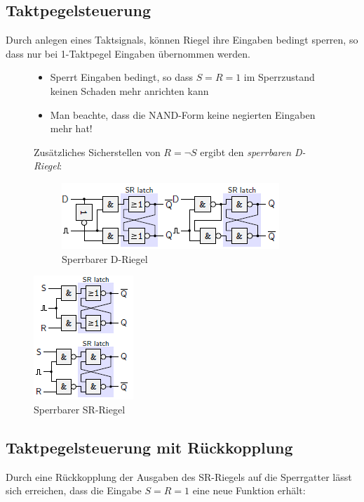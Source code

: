 \documentclass[12pt]{report}
\begin{document}
\subsection{Taktpegelsteuerung}
Durch anlegen eines Taktsignals, können Riegel ihre Eingaben bedingt sperren, so dass nur bei 1-Taktpegel Eingaben übernommen werden.
\begin{figure}[H]
  \begin{minipage}[t]{0.45\textwidth}
    \begin{itemize}
      \item Sperrt Eingaben bedingt, so dass $S=R=1$ im Sperrzustand keinen Schaden mehr anrichten kann
      \item Man beachte, dass die NAND-Form keine negierten Eingaben mehr hat!
    \end{itemize}

    Zusätzliches Sicherstellen von $R = \neg S$ ergibt den \textit{sperrbaren D-Riegel}:
    \begin{figure}[H]
      \caption{Sperrbarer D-Riegel}
      \centering
      \includegraphics{riegel_sperrbarer-d-riegel}
    \end{figure}
  \end{minipage}
  \hfill
  \begin{minipage}[t]{0.45\textwidth}
    \caption{Sperrbarer SR-Riegel}
    \centering
    \vspace{0px}
    \includegraphics{riegel_sperrbarer-sr-riegel}
  \end{minipage}
\end{figure}

\subsection{Taktpegelsteuerung mit Rückkopplung}
Durch eine Rückkopplung der Ausgaben des SR-Riegels auf die Sperrgatter lässt sich erreichen, 
dass die Eingabe $S=R=1$ eine neue Funktion erhält:
\end{document}
